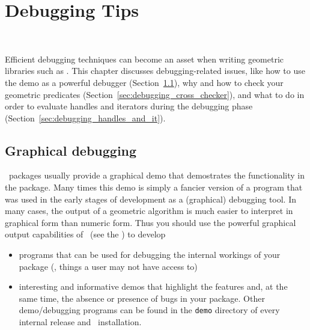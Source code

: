 
\chapter{Debugging Tips}
\label{chap:debugging}
 \\


Efficient debugging techniques can become an asset when writing geometric 
libraries such as \cgal. 
This chapter discusses debugging-related issues, like how to use 
the demo as a powerful debugger (Section~\ref{sec:graphical_debugging}), 
why and how to check your geometric predicates 
(Section~\ref{sec:debugging_cross_checker}), and what 
to do in order to evaluate handles and iterators during the debugging phase
(Section~\ref{sec:debugging_handles_and_it}).

\section{Graphical debugging} 
\label{sec:graphical_debugging}

\cgal\ packages usually provide a graphical demo that demostrates the 
functionality in the package.  Many times this demo is simply a fancier
version of a program that was used in the early stages of development as a
(graphical) debugging tool.  In many cases, the output of a geometric
algorithm is much easier to interpret in graphical form than numeric
form.  Thus you should use the powerful graphical output capabilities
of \cgal\ (see the ) 
to develop 
\begin{itemize}
   \item programs that can be used for debugging the internal workings
         of your package (\ie, things a user may not have access to)
   \item interesting and informative demos that highlight the features and, 
         at the same time, the absence or presence of bugs in your package.  
         Other demo/debugging programs can be found in the \texttt{demo} 
         directory 
         of every internal release and \cgal\ installation.
\end{itemize}

